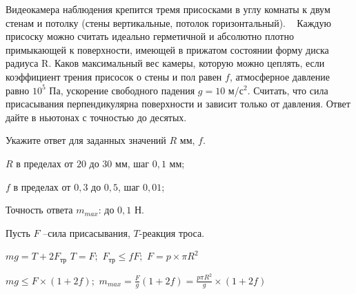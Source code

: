 
Видеокамера наблюдения крепится тремя присосками в углу
комнаты к двум стенам и потолку (стены вертикальные, потолок горизонтальный).   Каждую
присоску можно считать идеально герметичной и абсолютно плотно примыкающей к поверхности,
имеющей в прижатом состоянии форму диска радиуса R. Каков
максимальный вес камеры, которую можно цеплять, если коэффициент трения
присосок о стены и пол равен $f$, атмосферное
давление равно $10^5$ Па, ускорение свободного падения $g = 10$ м/с$^2$. Считать, что
сила присасывания перпендикулярна поверхности и зависит только от давления. Ответ дайте в ньютонах с точностью до десятых.

Укажите ответ для заданных значений $R$ мм, $f$.

\paramSection

$R$  в пределах от $20$ до $30$ мм, шаг $0,1$ мм;

$f$ в пределах от $0,3$ до $0,5$, шаг $0,01$;

Точность ответа $m_{max}$: до $0,1$ Н.

\solutionSection

Пусть $F$ –сила присасывания, $T$-реакция троса.

$mg=T+2F_{\text{тр}}$     $T=F;$     $ F_{\text{тр}} \leq fF;$   $F=p \times \pi R^2$  

$mg \leq F \times (1+2f);$     $m_{max}=\frac{F}{g}(1+2f)=\frac{p\pi R^2}{g} \times (1+2f)$

